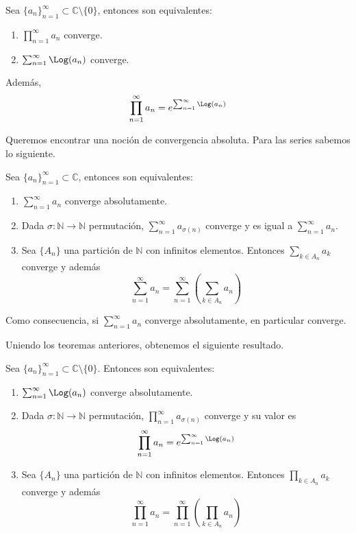 \begin{corollary}
    Sea $\{a_n\}_{n=1}^\infty \subset \mathbb{C} \setminus \{0\}$, entonces son equivalentes:
    \begin{enumerate}
        \item $\prod_{n=1}^\infty a_n$ converge.
        \item $\sum_{n=1}^\infty \Log(a_n)$ converge.
    \end{enumerate}
    Además,
    $$\prod_{n=1}^\infty a_n = e^{\sum_{n=1}^\infty \Log(a_n)}$$
\end{corollary}

Queremos encontrar una noción de convergencia absoluta.
Para las series sabemos lo siguiente.

\begin{theorem}
    Sea $\{a_n\}_{n=1}^\infty \subset \mathbb{C}$, entonces son equivalentes:
    \begin{enumerate}
        \item $\sum_{n=1}^\infty a_n$ converge absolutamente.
        \item Dada $\sigma: \mathbb{N} \to \mathbb{N}$ permutación, $\sum_{n=1}^\infty a_{\sigma(n)}$ converge y es igual a $\sum_{n=1}^\infty a_n$.
        \item Sea $\{A_n\}$ una partición de $\mathbb{N}$ con infinitos elementos.
              Entonces $\sum_{k \in A_n} a_k$ converge y además
              $$\sum_{n=1}^\infty a_n = \sum_{n=1}^\infty \left(\sum_{k \in A_n} a_n\right)$$
    \end{enumerate}
\end{theorem}

Como consecuencia, si $\sum_{n=1}^\infty a_n$ converge absolutamente, en particular converge.

Uniendo los teoremas anteriores, obtenemos el siguiente resultado.

\begin{theorem}
    Sea $\{a_n\}_{n=1}^\infty \subset \mathbb{C} \setminus \{0\}$.
    Entonces son equivalentes:
    \begin{enumerate}
        \item $\sum_{n=1}^\infty \Log(a_n)$ converge absolutamente.
        \item Dada $\sigma: \mathbb{N} \to \mathbb{N}$ permutación, $\prod_{n=1}^\infty a_{\sigma(n)}$ converge y su valor es
              $$\prod_{n=1}^\infty a_n = e^{\sum_{n=1}^\infty \Log(a_n)}$$
        \item Sea $\{A_n\}$ una partición de $\mathbb{N}$ con infinitos elementos.
              Entonces $\prod_{k \in A_n} a_k$ converge y además
              $$\prod_{n=1}^\infty a_n = \prod_{n=1}^\infty \left(\prod_{k \in A_n} a_n\right)$$
    \end{enumerate}
\end{theorem}

